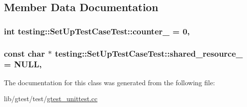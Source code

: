 \subsection{Member Data Documentation}
\hypertarget{classtesting_1_1_set_up_test_case_test_a5b6e811128d35389be49f6569bf93817}{
\subsubsection[{counter\-\_\-}]{\setlength{\rightskip}{0pt plus 5cm}int testing\-::\-Set\-Up\-Test\-Case\-Test\-::counter\-\_\- = 0\hspace{0.3cm}{\ttfamily [static]}, {\ttfamily [protected]}}}\label{classtesting_1_1_set_up_test_case_test_a5b6e811128d35389be49f6569bf93817}
\hypertarget{classtesting_1_1_set_up_test_case_test_a904e77fd9a628b6a9aca0280665fd040}{
\subsubsection[{shared\-\_\-resource\-\_\-}]{\setlength{\rightskip}{0pt plus 5cm}const char $\ast$ testing\-::\-Set\-Up\-Test\-Case\-Test\-::shared\-\_\-resource\-\_\- = N\-U\-L\-L\hspace{0.3cm}{\ttfamily [static]}, {\ttfamily [protected]}}}\label{classtesting_1_1_set_up_test_case_test_a904e77fd9a628b6a9aca0280665fd040}


The documentation for this class was generated from the following file\-:\begin{DoxyCompactItemize}
\item 
lib/gtest/test/\hyperlink{gtest__unittest_8cc}{gtest\-\_\-unittest.\-cc}\end{DoxyCompactItemize}

